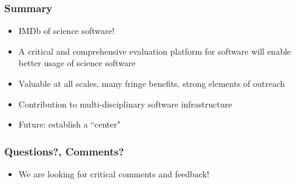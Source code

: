 \documentclass[hyperref={pdfpagelabels=false},12pt]{beamer}
\begin{document}
\begin{frame}
\frametitle{Summary}
\begin{itemize}
\itemsep1em
\item IMDb of science software!
\item
A critical and comprehensive evaluation platform for software will enable better usage of science software
\item
Valuable at all scales, many fringe benefits, strong elements of outreach
\item
Contribution to multi-disciplinary software infrastructure
\item
Future: establish a ``center"
\end{itemize}
\end{frame}

\begin{frame}
\frametitle{Questions?, Comments?}
\begin{itemize}
\item We are looking for critical comments and feedback!
\end{itemize}
\end{frame}
\end{document}
